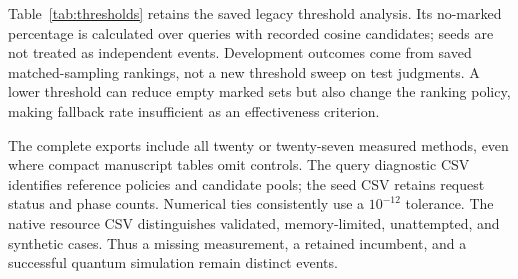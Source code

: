 Table~\ref{tab:thresholds} retains the saved legacy threshold analysis. Its no-marked percentage is calculated over queries with recorded cosine candidates; seeds are not treated as independent events. Development outcomes come from saved matched-sampling rankings, not a new threshold sweep on test judgments. A lower threshold can reduce empty marked sets but also change the ranking policy, making fallback rate insufficient as an effectiveness criterion.

\begin{table}[t]
\centering\small\setlength{\tabcolsep}{3pt}
\caption{Recorded legacy development thresholds. nDCG@5 comes from saved matched-sampling outcomes. No-marked percentages count development queries, with no new ranking or test tuning.}
\label{tab:thresholds}
\end{table}

The complete exports include all twenty or twenty-seven measured methods, even where compact manuscript tables omit controls. The query diagnostic CSV identifies reference policies and candidate pools; the seed CSV retains request status and phase counts. Numerical ties consistently use a $10^{-12}$ tolerance. The native resource CSV distinguishes validated, memory-limited, unattempted, and synthetic cases. Thus a missing measurement, a retained incumbent, and a successful quantum simulation remain distinct events.
